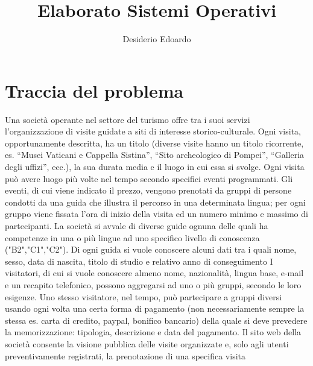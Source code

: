 \documentclass[a4paper,12pt]{report}
\title{Elaborato Sistemi Operativi}
\author{Desiderio Edoardo}
\begin{document}
\maketitle
\titlepage
\tableofcontents
\newpage

\chapter{Traccia del problema}
Una	 società	 operante	 nel	 settore	 del	 turismo	 offre	 tra	 i	 suoi	 servizi	 l’organizzazione	 di	 	 visite	
guidate	a	siti	di	interesse	storico-culturale.
Ogni	visita,	opportunamente	descritta,	ha	un	 titolo	 (diverse	visite	hanno	un	 titolo	 ricorrente,	es.	
“Musei	Vaticani	e	Cappella	Sistina”,	“Sito	archeologico	di	Pompei”,	“Galleria	degli	uffizi”,	ecc.),	la	
sua	durata	media		e	il	luogo		in	cui	essa	si	svolge.	Ogni	visita	può	avere	luogo	più	volte	nel	tempo	
secondo	specifici	eventi	programmati.
Gli	eventi,	di	cui	viene	indicato	il	prezzo,	vengono	prenotati	da	gruppi	di	persone	condotti	da	una	
guida	che	illustra	il	percorso	in	una	determinata	lingua;	per	ogni	gruppo	viene	fissata	l’ora	di	inizio	
della	visita	ed	un	numero	minimo	e	massimo	di	partecipanti.
La	società	si	avvale	di	diverse	guide	ognuna	delle	quali	ha	competenze	in	una	o	più	lingue	ad	uno	
specifico	 livello	 di	 conoscenza	 ("B2","C1","C2").	 	 Di	 ogni	 guida	 si	 vuole	
conoscere	 alcuni	 dati	 tra	 i	 quali	 nome,	 sesso,	 data	 di	 nascita,	 titolo	 di	 studio	 e	 relativo	 anno	 di	
conseguimento
I	visitatori,	di	cui	si	vuole	conoscere	almeno	nome,	nazionalità,	lingua	base,	e-mail	e	un	 recapito	
telefonico,	 possono	 aggregarsi	 ad	 uno	 o	 più	 gruppi,	 secondo	 le	 loro	 esigenze.	 Uno	 stesso	
visitatore,	 nel	 tempo,	 può	 partecipare	 a	 gruppi	 diversi	 usando	 ogni	 volta	 una	 certa	 forma	 di	
pagamento	(non	necessariamente	sempre	la	stessa	es.	carta	di	credito,	paypal,	bonifico	bancario)	
della	quale	si	deve	prevedere	la	memorizzazione:	tipologia,	descrizione	e	data	del	pagamento.
Il	 sito	 web	 della	 società	 consente	 la	 visione	 pubblica	 delle	 visite	 organizzate	 e,	 solo	 agli	 utenti	
preventivamente	registrati,	la	prenotazione	di	una	specifica	visita
\newpage
\begin{titlepage}
    
\end{titlepage}
\end{document}

